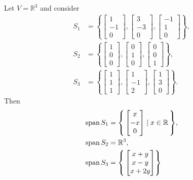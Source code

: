 \begin{Example}
Let $V=\mathbb R^3$ and consider
\begin{align*}
S_1&=\left\{\begin{bmatrix}1\\-1\\0\end{bmatrix},
\begin{bmatrix}3\\-3\\0\end{bmatrix},
\begin{bmatrix}-1\\1\\0\end{bmatrix}\right\},\\
S_2&=\left\{\begin{bmatrix}1\\0\\0\end{bmatrix},
\begin{bmatrix}0\\1\\0\end{bmatrix},
\begin{bmatrix}0\\0\\1\end{bmatrix}\right\},\\
S_3&=\left\{\begin{bmatrix}1\\1\\1\end{bmatrix},
\begin{bmatrix}1\\-1\\2\end{bmatrix},
\begin{bmatrix}1\\3\\0\end{bmatrix}\right\}.
\end{align*}
Then
\begin{align*}
\operatorname{span}S_1
 &=\qty{\, \begin{bmatrix}x\\-x\\0\end{bmatrix} \mid x\in\mathbb R\,},\\
\operatorname{span}S_2&=\mathbb R^3,\\
\operatorname{span}S_3
 &=\qty{\, \begin{bmatrix}x+y\\x-y\\x+2y\end{bmatrix}
}
\end{align*}
\end{Example}

